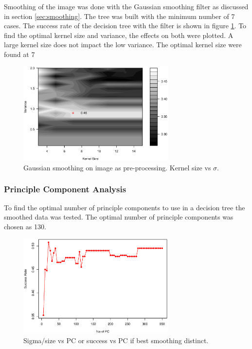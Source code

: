 Smoothing of the image was done with the Gaussian smoothing filter as discussed in section \ref{sec:smoothing}.
The tree was built with the minimum number of 7 cases.
The success rate of the decision tree with the filter is shown in figure \ref{fig:tree_smooth}.
To find the optimal kernel size and variance, the effects on both were plotted.
A large kernel size does not impact the low variance. The optimal kernel size were found at    7

\begin{figure}[H]
\centering
\includegraphics[width=0.7\textwidth]{graphics/tree_smooth}
\caption{Gaussian smoothing on image as pre-processing. Kernel size vs $\sigma$. }%
\label{fig:tree_smooth}
\end{figure}

\subsubsection{Principle Component Analysis}

To find the optimal number of principle components to use in a decision tree 
the smoothed data 
was tested.
The optimal number of principle components was chosen as 130.

\begin{figure}[H]
\centering
\includegraphics[width=0.7\textwidth]{graphics/tree_pca}
\caption{Sigma/size vs PC or success vs PC if best smoothing distinct.}
\end{figure}


